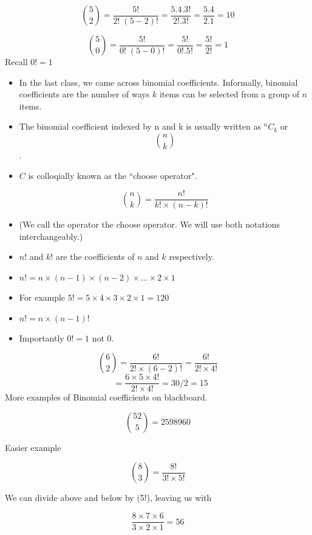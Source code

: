 \documentclass[]{report}
\begin{document}
{\[ \binom 5 2  = \frac{5!}{2!\;(5-2)!} = \frac{5.4.3!}{2! .3!} = \frac{5.4}{2.1} = 10\]


\[ \binom 5 0   = \frac{5!}{0!\;(5-0)!} = \frac{5!}{0! .5!} = \frac{5!}{2!} = 1\]
Recall $0! =1$

\begin{itemize}
	\item In the last class, we came across binomial coefficients. Informally, binomial coefficients are the number of ways $k$ items can be selected from a group of $n$ items. 
	
	\item The binomial coefficient indexed by n and k is usually written as $^nC_k$ or
	\[ {n \choose k}\].
	
	\item $C$ is colloqially known as the ``choose operator".
	
	\[ {n \choose k} = \frac{n!}{k! \times (n-k)!} \]
	
	\item (We call the operator the choose operator. We will use both notations interchangeably.)
	
	
\end{itemize}



\begin{itemize}
	\item $n!$ and $k!$ are the coefficients of $n$ and $k$ respectively.
	\item $n! = n \times (n-1) \times (n-2) \times \ldots \times 2 \times 1$
	\item For example $5! = 5\times4\times3\times2\times1 = 120$
	\item $n! = n \times (n-1)!$
	\item Importantly $0! = 1$ not 0.
\end{itemize}
\[ {6 \choose 2} = \frac{6!}{2! \times (6-2)!} = \frac{6!}{2! \times 4!}  \]\[\mbox{   } = \frac{6 \times 5 \times 4!}{2! \times 4!} 
= 30/2 =15 \]
More examples of Binomial coefficients on blackboard.



\[ { 52 \choose 5 } = 2598960 \]



Easier example

\[ { 8 \choose 3 } = \frac{8!}{3! \times 5!} \]


We can divide above and below by (5!), leaving us with

\[ \frac{8 \times 7 \times 6}{3 \times 2 \times 1} = 56 \]   

}
\end{document}
